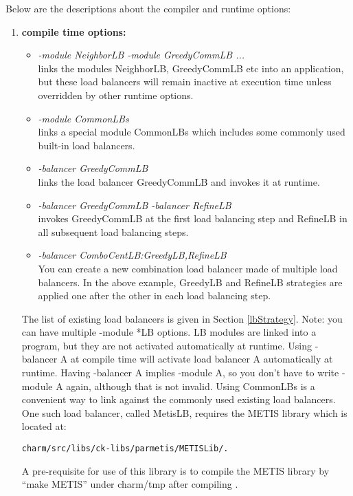 Below are the descriptions about the compiler and runtime options:

\begin{enumerate}
\item {\bf compile time options:}

\begin{itemize}
\item {\em -module NeighborLB -module GreedyCommLB ...}  \\
  links the modules NeighborLB, GreedyCommLB etc into an application, but these
load balancers will remain inactive at execution time unless overridden by other
runtime options.
\item {\em -module CommonLBs} \\
  links a special module CommonLBs which includes some commonly used \charmpp{}
built-in load balancers.
\item {\em -balancer GreedyCommLB} \\
  links the load balancer GreedyCommLB and invokes it at runtime.
\item {\em -balancer GreedyCommLB -balancer RefineLB} \\
  invokes GreedyCommLB at the first load balancing step and RefineLB in all
subsequent load balancing steps.
\item {\em -balancer ComboCentLB:GreedyLB,RefineLB}  \\
  You can create a new combination load balancer made of multiple
load balancers. In the above example, GreedyLB and RefineLB strategies are
applied one after the other in each load balancing step.
\end{itemize}

The list of existing load balancers is given in Section
\ref{lbStrategy}. Note: you can have multiple -module *LB options. LB
modules are linked into a program, but they are not activated
automatically at runtime.  Using -balancer A at compile time will
activate load balancer A automatically at runtime.  Having -balancer A
implies -module A, so you don't have to write -module A again,
although that is not invalid.  Using CommonLBs is a convenient way to
link against the commonly used existing load balancers.  One such load
balancer, called MetisLB, requires the METIS library which is located
at: 

\tt{charm/src/libs/ck-libs/parmetis/METISLib/.}

A pre-requisite for use of this library is to compile the METIS
library by ``make METIS'' under charm/tmp after compiling \charmpp{}.


\end{enumerate}

